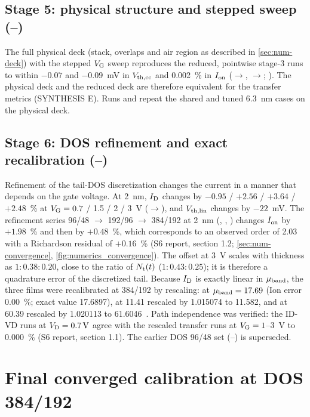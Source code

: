 \subsection{Stage 5: physical structure and stepped sweep (--)}
The full physical deck (stack, overlaps and air region as described in \cref{sec:num-deck}) with the stepped $V_{\mathrm{G}}$ sweep reproduces the reduced, pointwise stage-3 runs to within $-0.07$ and $-0.09$~mV in $V_{\mathrm{th,cc}}$ and 0.002~\% in $I_{\mathrm{on}}$ ($\rightarrow$, $\rightarrow$; ). The physical deck and the reduced deck are therefore equivalent for the transfer metrics (SYNTHESIS E). Runs  and  repeat the shared and tuned 6.3~nm cases on the physical deck.

\subsection{Stage 6: DOS refinement and exact recalibration (--)}
Refinement of the tail-DOS discretization changes the current in a manner that depends on the gate voltage. At 2~nm, $I_{\mathrm{D}}$ changes by $-0.95$ / $+2.56$ / $+3.64$ / $+2.48$~\% at $V_{\mathrm{G}}=0.7$ / 1.5 / 2 / 3~V ($\rightarrow$), and $V_{\mathrm{th,lin}}$ changes by $-22$~mV. The refinement series 96/48 $\rightarrow$ 192/96 $\rightarrow$ 384/192 at 2~nm (, , ) changes $I_{\mathrm{on}}$ by $+1.98$~\% and then by $+0.48$~\%, which corresponds to an observed order of 2.03 with a Richardson residual of $+0.16$~\% (S6 report, section 1.2; \cref{sec:num-convergence}, \cref{fig:numerics_convergence}). The offset at 3~V scales with thickness as $1:0.38:0.20$, close to the ratio of $N_{\mathrm{t}}(t)$ ($1:0.43:0.25$); it is therefore a quadrature error of the discretized tail. Because $I_{\mathrm{D}}$ is exactly linear in $\mu_{\mathrm{band}}$, the three films were recalibrated at 384/192 by rescaling:  at $\mu_{\mathrm{band}}=17.69$ (Ion error 0.00~\%; exact value 17.6897),  at 11.41 rescaled by 1.015074 to 11.582, and  at 60.39 rescaled by 1.020113 to 61.6046~\cmVs. Path independence was verified: the ID-VD runs at $V_{\mathrm{D}}=\SI{0.7}{V}$ agree with the rescaled transfer runs at $V_{\mathrm{G}}=1$--3~V to 0.000~\% (S6 report, section 1.1). The earlier DOS 96/48 set (--) is superseded.

\section{Final converged calibration at DOS 384/192}\label{sec:cal-final}

